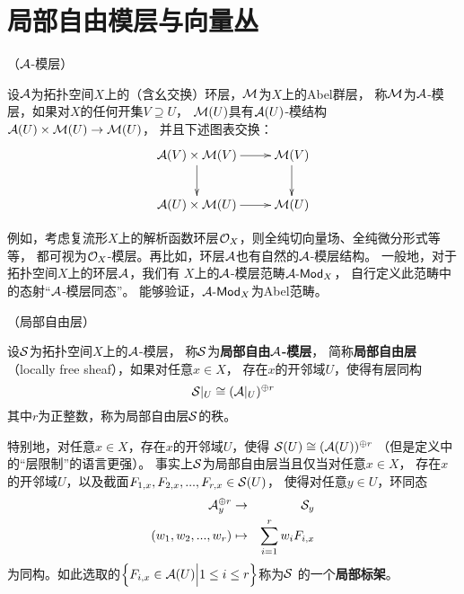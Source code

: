 \section{局部自由模层与向量丛}

\begin{definition}（$\mathcal{A}$-模层）

设$\mathcal{A}$为拓扑空间$X$上的（含幺交换）环层，$\mathcal{M}$为$X$上的Abel群层，
称$\mathcal{M}$为$\mathcal{A}$-模层，如果对$X$的任何开集$V\supseteq U$，
$\mathcal{M}(U)$具有$\mathcal{A}(U)$-模结构$\mathcal{A}(U)\times\mathcal{M}(U)\to\mathcal{M}(U)$，
并且下述图表交换：
$$
  \xymatrix{
     \mcalA(V)\times\mcalM(V)
       \ar[r]
       \ar[d]
    &\mcalM(V)
       \ar[d]
  \\
     \mcalA(U)\times\mcalM(U)
       \ar[r]
    &\mcalM(U)
  }
$$
\end{definition}

例如，考虑复流形$X$上的解析函数环层$\mathcal{O}_X$，则全纯切向量场、全纯微分形式等等，
都可视为$\mathcal{O}_X$-模层。再比如，环层$\mathcal{A}$也有自然的$\mathcal{A}$-模层结构。
一般地，对于拓扑空间$X$上的环层$\mathcal{A}$，我们有
$X$上的$\mathcal{A}$-模层范畴$\mathcal{A}\operatorname{\!\text{-}\mathsf{Mod}}_X$，
自行定义此范畴中的态射“$\mathcal{A}$-模层同态”。
能够验证，$\mathcal{A}\operatorname{\!\text{-}\mathsf{Mod}}_X$为Abel范畴。

\begin{definition}（局部自由层）

设$\mathcal{S}$为拓扑空间$X$上的$\mathcal{A}$-模层，
称$\mathcal{S}$为\textbf{局部自由$\mathcal{A}$-模层}，
简称\textbf{局部自由层}（locally free sheaf），如果对任意$x\in X$，
存在$x$的开邻域$U$，使得有层同构
$$\mathcal{S}|_U\cong(\mathcal{A}|_U)^{\oplus r}$$
其中$r$为正整数，称为局部自由层$\mathcal{S}$的秩。
\end{definition}

特别地，对任意$x\in X$，存在$x$的开邻域$U$，使得
$\mathcal{S}(U)\cong(\mathcal{A}(U))^{\oplus r}$
（但是定义中的“层限制”的语言更强）。
事实上$\mathcal{S}$为局部自由层当且仅当对任意$x\in X$，
存在$x$的开邻域$U$，以及截面$F_{1,x},F_{2,x},...,F_{r,x}\in\mathcal{S}(U)$，
使得对任意$y\in U$，环同态
\begin{eqnarray*}
     \mathcal{A}_y^{\oplus r}&\to&\mathcal{S}_y\\
     (w_1,w_2,...,w_r)
&\mapsto&\sum_{i=1}^{r}w_iF_{i,x}
\end{eqnarray*}
为同构。如此选取的$\Big\{ F_{i,x}\in\mathcal{A}(U) \Big| 1\leq i\leq r \Big\}$称为$\mathcal{S}$
的一个\textbf{局部标架}。

